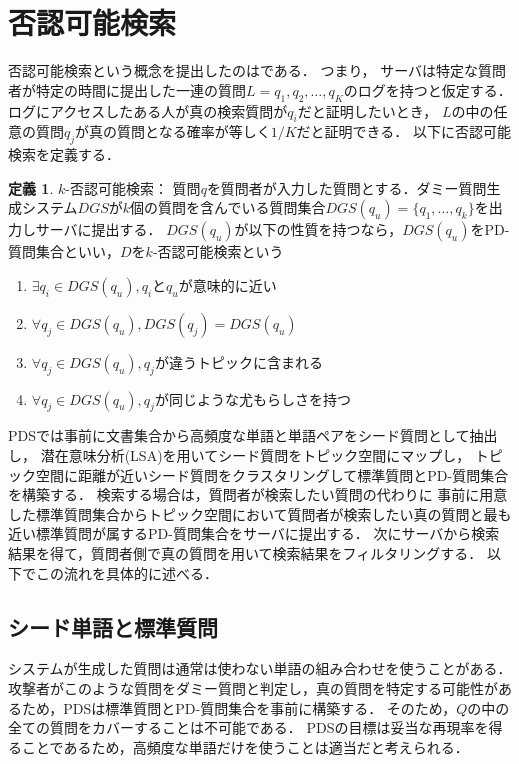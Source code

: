 \documentclass[master]{suribt}
\theoremstyle{definition}
\newtheorem{defi}[thm]{定義}
\begin{document}
 \section{否認可能検索}\label{s:PDS}
 否認可能検索という概念を提出したのは\cite{PDS2008}である．
 つまり， サーバは特定な質問者が特定の時間に提出した一連の質問$L = {q_1, q_2, \dots , q_K}$のログを持つと仮定する． 
 ログにアクセスしたある人が真の検索質問が$q_i$だと証明したいとき， $L$の中の任意の質問$q_j$が真の質問となる確率が等しく$1/K$だと証明できる．
 以下に否認可能検索を定義する．
 \begin{defi}{$k$-否認可能検索：}
 	質問$q$を質問者が入力した質問とする．ダミー質問生成システム$DGS$が$k$個の質問を含んでいる質問集合$DGS(q_u)=\{q_1, \dots , q_k\}$を出力しサーバに提出する．
	$DGS(q_u)$が以下の性質を持つなら，$DGS(q_u)$をPD-質問集合といい，$D$を$k$-否認可能検索という
	\begin{enumerate}
	\item $\exists q_i \in DGS(q_u),q_i$と$q_u$が意味的に近い
	\item $\forall q_j \in DGS(q_u),DGS(q_j) = DGS(q_u)$
	\item $\forall q_j \in DGS(q_u),q_j$が違うトピックに含まれる
	\item $\forall q_j \in DGS(q_u),q_j$が同じような尤もらしさを持つ
	\end{enumerate}
  \end{defi}
 PDSでは事前に文書集合から高頻度な単語と単語ペアをシード質問として抽出し，
 潜在意味分析(LSA)\cite{LSA1990}を用いてシード質問をトピック空間にマップし，
 トピック空間に距離が近いシード質問をクラスタリングして標準質問とPD-質問集合を構築する．
 検索する場合は，質問者が検索したい質問の代わりに
 事前に用意した標準質問集合からトピック空間において質問者が検索したい真の質問と最も近い標準質問が属するPD-質問集合をサーバに提出する．
 次にサーバから検索結果を得て，質問者側で真の質問を用いて検索結果をフィルタリングする．
 以下でこの流れを具体的に述べる．
 \subsection{シード単語と標準質問}
 システムが生成した質問は通常は使わない単語の組み合わせを使うことがある．
 攻撃者がこのような質問をダミー質問と判定し，真の質問を特定する可能性があるため，PDSは標準質問とPD-質問集合を事前に構築する．
 そのため，$Q$の中の全ての質問をカバーすることは不可能である．
 PDSの目標は妥当な再現率を得ることであるため，高頻度な単語だけを使うことは適当だと考えられる．
 
\end{document}
